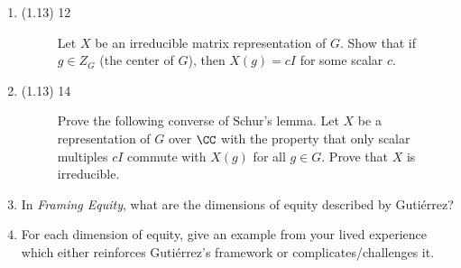 \documentclass{math174}
\date{Monday, February 18}
\author{}
\begin{document}
\begin{enumerate}
\item
  \begin{description}
  \item[(1.13) 12] Let \(X\) be an irreducible matrix representation
    of \(G\).  Show that if \(g \in Z_G\) (the center of \(G\)), then
    \(X(g) = cI\) for some scalar \(c.\)

    \begin{solution}

    \end{solution}
  \end{description}
\item
  \begin{description}
  \item[(1.13) 14] Prove the following converse of Schur's lemma.  Let
    \(X\) be a representation of \(G\) over \(\CC\) with the property
    that only scalar multiples \(cI\) commute with \(X(g)\) for all
    \(g \in G\).  Prove that \(X\) is irreducible.

    \begin{solution}

    \end{solution}
  \end{description}
\item In \textit{Framing Equity}, what are the dimensions of equity
  described by Guti\'errez?

  \begin{solution}

  \end{solution}

\item For each dimension of equity, give an example from your lived
  experience which either reinforces Guti\'errez's framework or
  complicates/challenges it.

  \begin{solution}

  \end{solution}
\end{enumerate}
\end{document}
